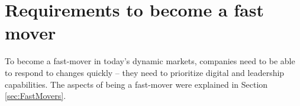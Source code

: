 \documentclass[a4]{scrartcl}
\newenvironment{CountingDefinition}[2][]{%
	\ifstrempty{#1}%
	{\mdfsetup{%
			frametitle={{\strut ~}}}
	}%
	{\mdfsetup{%
			frametitle={{\strut ~#1}}}%
	}%
	\mdfsetup{
		nobreak                   = true,
		linecolor                 = gray,
		frametitlebackgroundcolor = gray!50,
		style                     = enviStyle
	}
	\begin{mdframed}[]\relax%
		\label{#2}}{\end{mdframed}}
\begin{document}
	
	
	
	
	
	
	
	
	
	\newpage
	\section{Requirements to become a fast mover} \label{sec:ReqFastMovers}
	
	
	To become a fast-mover in today's dynamic markets, companies need to be able to respond to changes quickly -- they need to prioritize digital and leadership capabilities. The aspects of being a fast-mover were explained in Section \ref{sec:FastMovers}.
	
	
\end{document}
